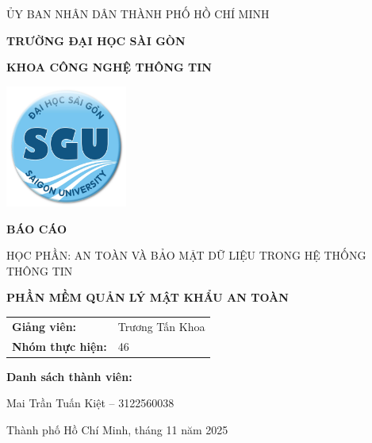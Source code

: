 \documentclass[11pt, a4paper]{report}
\begin{document}
\begin{titlepage}
    \centering
    \sffamily

    {\Large ỦY BAN NHÂN DÂN THÀNH PHỐ HỒ CHÍ MINH\par}
    {\LARGE \textbf{TRƯỜNG ĐẠI HỌC SÀI GÒN}\par}
    {\Large \textbf{KHOA CÔNG NGHỆ THÔNG TIN}\par}
    \vspace{1cm}

    \includegraphics[width=0.3\textwidth]{images/logo_sgu.png}

    \vfill

    {\Huge \textbf{BÁO CÁO}}\par
    \vspace{0.5cm}
    {\Large HỌC PHẦN: AN TOÀN VÀ BẢO MẬT DỮ LIỆU TRONG HỆ THỐNG THÔNG TIN}\par
    
    \vspace{1cm}
    {\Huge \textbf{PHẦN MỀM QUẢN LÝ MẬT KHẨU AN TOÀN}}\par

    \vfill

    \begin{flushright}
    \large
    \begin{tabular}{ll}
        \textbf{Giảng viên:} & Trương Tấn Khoa \\
        \textbf{Nhóm thực hiện:} & 46 \\
    \end{tabular}
    \end{flushright}

    \vspace{0.5cm}

    \textbf{\large Danh sách thành viên:}\par
    \large Mai Trần Tuấn Kiệt – 3122560038\par

    \vfill

    {\large Thành phố Hồ Chí Minh, tháng 11 năm 2025\par}
\end{titlepage}
\end{document}
